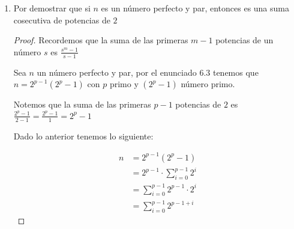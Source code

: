 \documentclass[12pt]{article}
\begin{document}
\begin{enumerate}
\begin{proof}
\begin{itemize}
            \item Por demostrar que si $\sum_{d \mid n} \frac{1}{d} = 2$ entonces $n$ es un número entero perfecto
            
            Dado que $\sum_{d \mid n} \frac{1}{d} = 2$ multiplicamos la expresion por $n$ y obtenemos lo siguiente:
            
            \begin{align*}
                 2 &= \sum_{d \mid n} \frac{1}{d}\\
                 2n &= n \cdot \sum_{d \mid n} \frac{1}{d} \\
                    &=  \sum_{d \mid n} n \cdot \frac{1}{d} \\
                    &= \sum_{d \mid n} \frac{n}{d}
            \end{align*}
            
             
            Recordemos que si $d \mid n$ entonces existe una $q$ tal que  $dq = n$ y además $q = \frac{n}{d}$ y $\frac{n}{q} = d$, por lo que $\sum_{d \mid n} \frac{n}{d} = \sum_{d \mid n} d$
            
            Por lo tanto $\sum_{d \mid n} d = 2n \implies \sigma(n) = 2n$, por lo cual $n$ es un número entero perfecto
        \end{itemize}
        
        
        
        
        \end{proof}
        
        
        
        \item Por demostrar que si $n$ es un número perfecto y par, entonces es una suma cosecutiva de potencias de $2$
        
        \begin{proof}
        Recordemos que la suma de las primeras $m-1$ potencias de un número $s$ es $\frac{s^m - 1}{s - 1}$
        
        Sea $n$ un número perfecto y par, por el enunciado $6$.$3$ tenemos que $n = 2^{p-1} (2^p - 1)$ con $p$ primo y $(2^p - 1)$ número primo.
        
        Notemos que la suma de las primeras $p-1$ potencias de $2$ es $\frac{2^p - 1}{2 - 1} = \frac{2^p - 1}{1} = 2^p - 1$
        
        Dado lo anterior tenemos lo siguiente:
        
        \begin{align*}
            n &= 2^{p-1} (2^p - 1) \\
              &= 2^{p-1} \cdot \sum_{i = 0}^{p-1} 2^i \\
              &= \sum_{i = 0}^{p-1} 2^{p-1} \cdot 2^i \\
              &= \sum_{i = 0}^{p-1} 2^{p-1 + i}
        \end{align*}
        

\end{proof}
\end{enumerate}
\end{document}
